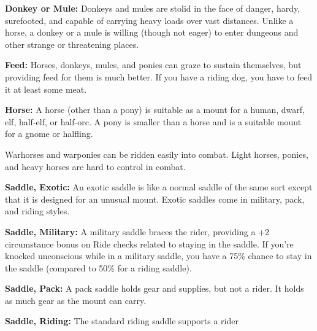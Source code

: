 \textbf{Donkey or Mule:} Donkeys and mules are stolid in the face of danger, hardy, 
surefooted, and capable of carrying heavy loads over vast distances. Unlike a horse, 
a donkey or a mule is willing (though not eager) to enter dungeons and other strange 
or threatening places.

\textbf{Feed:} Horses, donkeys, mules, and ponies can graze to sustain themselves, 
but providing feed for them is much better. If you have a riding dog, you have 
to feed it at least some meat.

\textbf{Horse:} A horse (other than a pony) is suitable as a mount for a human, 
dwarf, elf, half-elf, or half-orc. A pony is smaller than a horse and is a suitable 
mount for a gnome or halfling.

Warhorses and warponies can be ridden easily into combat. Light horses, ponies, 
and heavy horses are hard to control in combat.

\textbf{Saddle, Exotic:} An exotic saddle is like a normal saddle of the same sort 
except that it is designed for an unusual mount. Exotic saddles come in military, 
pack, and riding styles.

\textbf{Saddle, Military:} A military saddle braces the rider, providing a +2 circumstance 
bonus on Ride checks related to staying in the saddle. If you're knocked unconscious 
while in a military saddle, you have a 75\% chance to stay in the saddle (compared 
to 50\% for a riding saddle).

\textbf{Saddle, Pack:} A pack saddle holds gear and supplies, but not a rider. 
It holds as much gear as the mount can carry.

\textbf{Saddle, Riding:} The standard riding saddle supports a rider